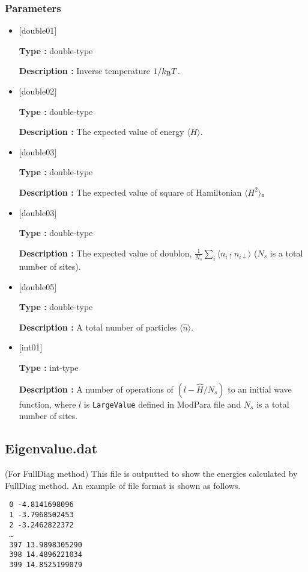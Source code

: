\subsubsection{Parameters}
 \begin{itemize}

  \item  $[$double01$]$
  
 {\bf Type :} double-type

{\bf Description :} Inverse temperature $1/{k_{\rm B}T}$.
 
  \item $[$double02$]$

 {\bf Type :} double-type 

{\bf Description :}  The expected value of  energy $\langle H \rangle$.

  \item $[$double03$]$

 {\bf Type :} double-type 

{\bf Description :} The expected value of square of Hamiltonian $\langle H^2 \rangle$。

  \item $[$double03$]$

 {\bf Type :} double-type 

{\bf Description :} The expected value of doublon, 
$\frac{1}{N_s} \sum_{i}\langle n_{i\uparrow}n_{i\downarrow}\rangle$ ($N_{s}$ is a total number of sites).

  \item $[$double05$]$

 {\bf Type :} double-type 

{\bf Description :} A total number of particles $\langle {\hat n} \rangle$.


  \item $[$int01$]$

 {\bf Type :} int-type 

{\bf Description :} A number of operations of $(l-\hat{H}/N_{s})$ to an initial wave function, where $l$ is \verb|LargeValue| defined in ModPara file and $N_{s}$ is a total number of sites.

 \end{itemize}


\newpage
\subsection{Eigenvalue.dat}
\label{Subsec:eigenvalue}
(For FullDiag method) This file is outputted to show the energies calculated by FullDiag method. An example of file format is shown as follows.\\
\begin{minipage}{12.5cm}
\begin{screen}
\begin{verbatim}
 0 -4.8141698096 
 1 -3.7968502453 
 2 -3.2462822372 
 …
 397 13.9898305290 
 398 14.4896221034 
 399 14.8525199079 
\end{verbatim}
\end{screen}
\end{minipage}

